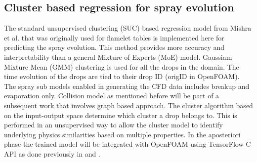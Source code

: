 \documentclass[letterpaper,twocolumn,10pt]{article}
\begin{document}
\subsection{Cluster based regression for spray evolution}

The standard unsupervised clustering (SUC) based regression model from Mishra et al. \cite{Mishra2023}
that was originally used for flamelet tables is implemented here for predicting the spray evolution. This method provides more accuracy and interpretability than a general Mixture of Experts (MoE) model. Gaussiam Mixture Mean (GMM) clustering is used for all the drops in the domain. The time evolution of the drops are tied to their drop ID (origID in OpenFOAM). The spray sub models enabled in generating the CFD data includes breakup and evaporation only. Collision model as mentioned before will be part of a subsequent work that involves graph based approach. The cluster algorithm based on the input-output space determine which cluster a drop belongs to. This is performed in an unsupervised way to allow the cluster model to identify underlying physics similarities based on multiple properties. In the aposteriori phase the trained model will be integrated with OpenFOAM using TensorFlow C API as done previously in \cite{Mishra2022} and \cite{Mishra2026}.
\end{document}
